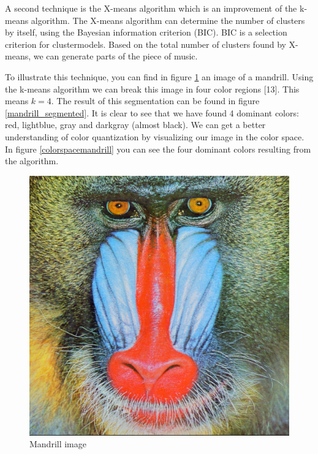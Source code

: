 \documentclass[12pt]{article}
\begin{document}
A second technique is the X-means algorithm which is an improvement of the k-means algorithm. The X-means algorithm can determine the number of clusters by itself, using the Bayesian information criterion (BIC). BIC is a selection criterion for clustermodels. Based on the total number of clusters found by X-means, we can generate parts of the piece of music.
\newline

To illustrate this technique, you can find in figure \ref{mandrill} an image of a mandrill. Using the k-means algorithm we can break this image in four color regions [13]. This means $k = 4$. The result of this segmentation can be found in figure \ref{mandrill_segmented}. It is clear to see that we have found 4 dominant colors: red, lightblue, gray and darkgray (almost black). We can get a better understanding of color quantization by visualizing our image in the color space. In figure \ref{colorspacemandrill} you can see the four dominant colors resulting from the algorithm.  

\begin{figure}[H]
\centering
\includegraphics[scale = 0.39]{img/mandrill}
\caption{Mandrill image}
\label{mandrill}
\end{figure}
\end{document}
